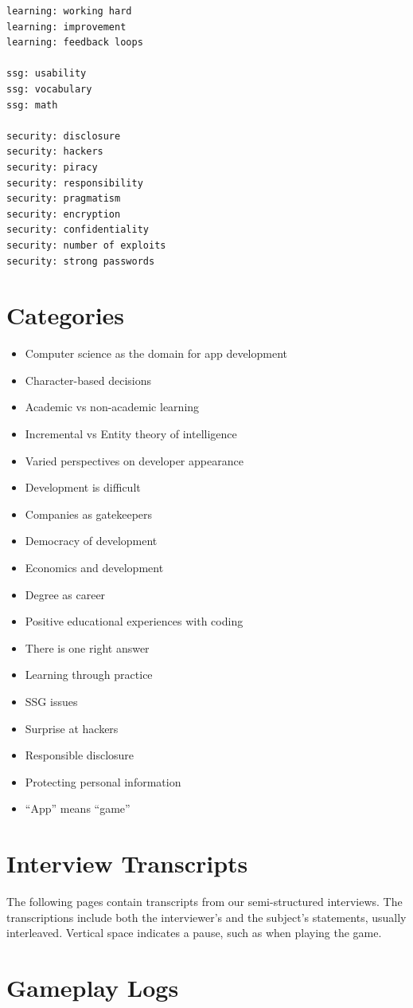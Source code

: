 \documentclass[letterpaper]{article}
\begin{document}
\begin{multicols}{2}
\begin{verbatim}
learning: working hard
learning: improvement
learning: feedback loops

ssg: usability
ssg: vocabulary
ssg: math

security: disclosure
security: hackers
security: piracy
security: responsibility
security: pragmatism
security: encryption
security: confidentiality
security: number of exploits
security: strong passwords
\end{verbatim}
\end{multicols}

\clearpage
\section{Categories}
\label{appendix:categories}
\begin{itemize}
\item[] Computer science as the domain for app development
\item[] Character-based decisions
\item[] Academic vs non-academic learning
\item[] Incremental vs Entity theory of intelligence
\item[] Varied perspectives on developer appearance
\item[] Development is difficult
\item[] Companies as gatekeepers
\item[] Democracy of development
\item[] Economics and development
\item[] Degree as career
\item[] Positive educational experiences with coding
\item[] There is one right answer
\item[] Learning through practice
\item[] SSG issues
\item[] Surprise at hackers
\item[] Responsible disclosure
\item[] Protecting personal information
\item[] ``App'' means ``game''
\end{itemize}

\clearpage
\section{Interview Transcripts}
The following pages contain transcripts from our semi-structured
interviews. The transcriptions include both the interviewer's
and the subject's statements, usually interleaved. Vertical space
indicates a pause, such as when playing the game.



\clearpage
\section{Gameplay Logs}

\end{document}
